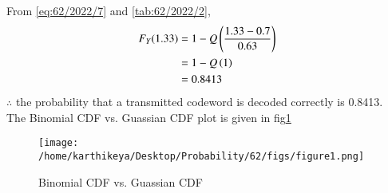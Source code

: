 \documentclass[article]{IEEEtran}
\theoremstyle{remark}
\begin{document}
From \eqref{eq:62/2022/7} and \autoref{tab:62/2022/2},
\begin{align}
	F_Y(1.33)&=1-Q\left( \frac{1.33-0.7}{0.63}\right) \\
	&= 1-Q\left(1\right)\\
	&= 0.8413
\end{align}
$\therefore$ the probability that a transmitted codeword is decoded correctly is 0.8413.
\\The Binomial CDF vs. Guassian CDF plot is given in fig\ref{fig:62/2022}
\begin{figure}[ht!]
    \centering
    \texttt{[image: /home/karthikeya/Desktop/Probability/62/figs/figure1.png]}
    \caption{Binomial CDF vs. Guassian CDF}
    \label{fig:62/2022}
\end{figure}
\end{document}

